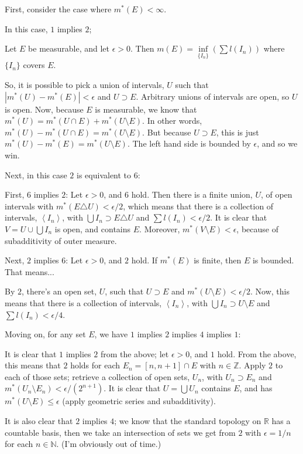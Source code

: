 \documentclass[a4paper,12pt]{article}
\newcommand{\tab}{\hspace{4mm}} %
\newcommand{\absval}[1]{\left\lvert #1 \right\rvert}
\newcommand{\anbrack}[1]{\left\langle #1 \right\rangle}
\newcommand{\ep}{\epsilon}
\newcommand{\N}{\mathbb{N}}
\newcommand{\R}{\mathbb{R}}
\newcommand{\Z}{\mathbb{Z}}
\begin{document}
First, consider the case where $m^*(E) < \infty$.

In this case, $1$ implies $2$;

\tab Let $E$ be measurable, and let $\ep >0$. Then $m(E) = \inf\limits_{\{I_n\}}(\sum l(I_n))$ where $\{I_n\}$ covers $E$.

\tab So, it is possible to pick a union of intervals, $U$ such that $\absval{m^*(U) - m^*(E)} < \ep$ and $U \supset E$. Arbitrary unions of intervals are open, so $U$ is open. Now, because $E$ is measurable, we know that $m^*(U) = m^*(U \cap E) + m^*(U \setminus E)$. In other words, $m^*(U) - m^*(U \cap E) = m^*(U \setminus E)$. But because $U \supset E$, this is just $m^*(U) - m^*(E) = m^*(U \setminus E)$.  The left hand side is bounded by $\ep$, and so we win.

Next, in this case $2$ is equivalent to $6$: %

\tab First, $6$ implies $2$: Let $\ep>0$, and $6$ hold. Then there is a finite union, $U$, of open intervals with $m^*(E \triangle U) < \ep/2$, which means that there is a collection of intervals, $\anbrack{I_n}$, with $\bigcup I_n \supset E \triangle U$ and $\sum l(I_n) < \ep/2$. It is clear that $V = U \cup \bigcup{I_n}$ is open, and contains $E$. Moreover, $m^*(V \setminus E) < \ep$, because of subadditivity of outer measure.

\tab Next, $2$ implies $6$: Let $\ep>0$, and $2$ hold. If $m^*(E)$ is finite, then $E$ is bounded. That means...%

\tab By $2$, there's an open set, $U$, such that $U \supset E$ and $m^*(U \setminus E) < \ep/2$. Now, this means that there is a collection of intervals, $\anbrack{I_n}$, with $\bigcup I_n \supset U \setminus E$ and $\sum l(I_n) < \ep/4$.

Moving on, for any set $E$, we have $1$ implies $2$ implies $4$ implies $1$:

\tab It is clear that $1$ implies $2$ from the above; let $\ep >0$, and $1$ hold. From the above, this means that $2$ holds for each $E_n = [n,n+1] \cap E$ with $n \in \Z$. Apply $2$ to each of those sets; retrieve a collection of open sets, $U_n$, with $U_n \supset E_n$ and $m^*(U_n \setminus E_n) < \ep/(2^{n+1})$. It is clear that $U = \bigcup U_n$ contains $E$, and has $m^*(U \setminus E) \leq \ep$ (apply geometric series and subadditivity).

\tab It is also clear that $2$ implies $4$; we know that the standard topology on $\R$ has a countable basis, then we take an intersection of sets we get from $2$ with $\ep = 1/n$ for each $n \in \N$. (I'm obviously out of time.)
\end{document}
